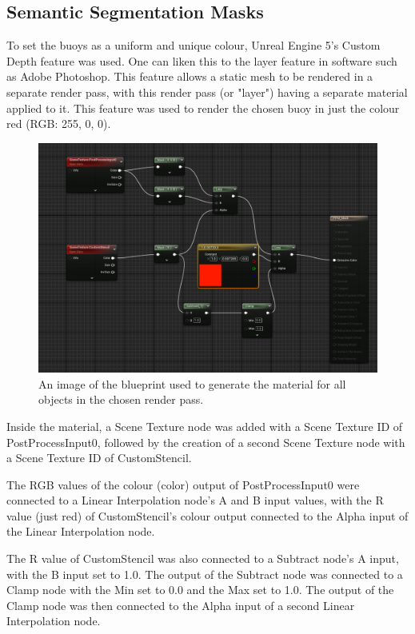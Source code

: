 \documentclass[10pt,twocolumn,letterpaper]{article}
\begin{document}
\subsection{Semantic Segmentation Masks} \label {sec:semantic_segmentation_masks}

To set the buoys as a uniform and unique colour, Unreal Engine 5's Custom Depth feature was used. One can liken this to the layer feature in software such as Adobe Photoshop. This feature allows a static mesh to be rendered in a separate render pass, with this render pass (or "layer") having a separate material applied to it.  This feature was used to render the chosen buoy in just the colour red (RGB: 255, 0, 0).

\begin{figure}[t]
    \centering
    \includegraphics[width=\linewidth]{images/ppm_mask.png}
    \caption{An image of the blueprint used to generate the material for all objects in the chosen render pass.}
    \label{fig:ppm_mask}
\end{figure}

Inside the material, a Scene Texture node was added with a Scene Texture ID of PostProcessInput0, followed by the creation of a second Scene Texture node with a Scene Texture ID of CustomStencil.

The RGB values of the colour (color) output of PostProcessInput0 were connected to a Linear Interpolation node's A and B input values, with the R value (just red) of CustomStencil's colour output connected to the Alpha input of the Linear Interpolation node.

The R value of CustomStencil was also connected to a Subtract node's A input, with the B input set to 1.0. The output of the Subtract node was connected to a Clamp node with the Min set to 0.0 and the Max set to 1.0. The output of the Clamp node was then connected to the Alpha input of a second Linear Interpolation node.
\end{document}
